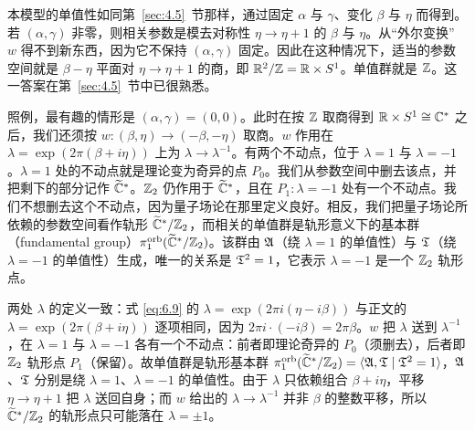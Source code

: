 本模型的单值性如同第~\ref{sec:4.5}~节那样，通过固定 $\alpha$ 与 $\gamma$、变化 $\beta$ 与 $\eta$ 而得到。若 $(\alpha,\gamma)$ 非零，则相关参数是模去对称性 $\eta\to \eta+1$ 的 $\beta$ 与 $\eta$。从“外尔变换” $w$ 得不到新东西，因为它不保持 $(\alpha,\gamma)$ 固定。因此在这种情况下，适当的参数空间就是 $\beta-\eta$ 平面对 $\eta\to \eta+1$ 的商，即 ${\mathbb{R}}^2/{\mathbb{Z}}={\mathbb{R}}\times S^1$。单值群就是 ${\mathbb{Z}}$。这一答案在第~\ref{sec:4.5}~节中已很熟悉。

照例，最有趣的情形是 $(\alpha,\gamma)=(0,0)$。此时在按 ${\mathbb{Z}}$ 取商得到 ${\mathbb{R}}\times S^1\cong{\mathbb{C}}^*$ 之后，我们还须按 $w:(\beta,\eta)\to (-\beta,-\eta)$ 取商。$w$ 作用在 $\lambda=\exp\left(2\pi(\beta+i\eta)\right)$ 上为 $\lambda\to\lambda^{-1}$。有两个不动点，位于 $\lambda=1$ 与 $\lambda=-1$。$\lambda=1$ 处的不动点就是理论变为奇异的点 $P_0$。我们从参数空间中删去该点，并把剩下的部分记作 $\widetilde{{\mathbb{C}}}^*$。${\mathbb{Z}}_2$ 仍作用于 $\widetilde {{\mathbb{C}}}^*$，且在 $P_1:\lambda=-1$ 处有一个不动点。我们不想删去这个不动点，因为量子场论在那里定义良好。相反，我们把量子场论所依赖的参数空间看作轨形 $\widetilde {{\mathbb{C}}}^*/{\mathbb{Z}}_2$，而相关的单值群是轨形意义下的基本群（fundamental group）$\pi_1^{\rm orb}(\widetilde {{\mathbb{C}}}^*/{\mathbb{Z}}_2)$。该群由 $\mathfrak{A}$（绕 $\lambda=1$ 的单值性）与 $\mathfrak{T}$（绕 $\lambda=-1$ 的单值性）生成，唯一的关系是 $\mathfrak{T}^2=1$，它表示 $\lambda=-1$ 是一个 ${\mathbb{Z}}_2$ 轨形点。

\begin{yizhu}[易错点]两处 $\lambda$ 的定义一致：式 \eqref{eq:6.9} 的 $\lambda=\exp(2\pi i(\eta-i\beta))$ 与正文的 $\lambda=\exp(2\pi(\beta+i\eta))$ 逐项相同，因为 $2\pi i\cdot(-i\beta)=2\pi\beta$。$w$ 把 $\lambda$ 送到 $\lambda^{-1}$，在 $\lambda=1$ 与 $\lambda=-1$ 各有一个不动点：前者即理论奇异的 $P_0$（须删去），后者即 ${\mathbb{Z}}_2$ 轨形点 $P_1$（保留）。故单值群是轨形基本群 $\pi_1^{\rm orb}(\widetilde{{\mathbb{C}}}^*/{\mathbb{Z}}_2)=\langle\mathfrak{A},\mathfrak{T}\mid\mathfrak{T}^2=1\rangle$，$\mathfrak{A}$、$\mathfrak{T}$ 分别是绕 $\lambda=1$、$\lambda=-1$ 的单值性。由于 $\lambda$ 只依赖组合 $\beta+i\eta$，平移 $\eta\to\eta+1$ 把 $\lambda$ 送回自身；而 $w$ 给出的 $\lambda\to\lambda^{-1}$ 并非 $\beta$ 的整数平移，所以 $\widetilde{{\mathbb{C}}}^*/{\mathbb{Z}}_2$ 的轨形点只可能落在 $\lambda=\pm1$。\end{yizhu}


